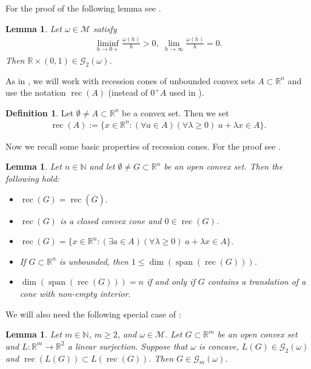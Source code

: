 \documentclass[10pt,a4paper]{amsart}
\newtheorem{lemma}[theorem]{Lemma}
\theoremstyle{definition}
\newtheorem{definition}[theorem]{Definition}
\newcommand{\R}{\mathbb{R}}
\newcommand{\N}{\mathbb{N}}
\newcommand{\M}{\mathcal{M}}
\newcommand{\rec}{\operatorname{rec}}
\newcommand{\spann}{\operatorname{span}}
\begin{document}
For the proof of the following lemma see \cite[Example 5.1]{KZ}.

\begin{lemma}\label{le_kz1}
Let $ \omega\in\M $ satisfy
\begin{align*}
\liminf_{h\to 0+}\frac{\omega(h)}{h}>0,\;\lim_{h\to\infty}\frac{\omega(h)}{h}=0.
\end{align*}
Then $ \R\times (0,1)\in\mathcal{G}_2(\omega) $.
\end{lemma}

As in \cite{KZ}, we will work with recession cones of unbounded convex sets $  A\subset\R^n $ and use the notation $ \rec(A) $ (instead of $ 0^+A $ used in \cite{R}).

\begin{definition}
Let $ \emptyset\neq A\subset\R^n $ be a convex set. Then we set
\begin{align*}
\rec(A):=\lbrace x\in\R^n:(\forall a\in A)(\forall\lambda\geq 0)\;a+\lambda x\in A\rbrace.
\end{align*}
\end{definition}

Now we recall some basic properties of recession cones. For the proof see \cite[Lemma 2.10]{KZ}.

\begin{lemma}\label{le_rec}
Let $ n\in\N $ and let $ \emptyset\neq G\subset\R^n $ be an open convex set. Then the following hold:
\begin{itemize}
\item[(i)] $ \rec(G)=\rec(\overline{G}) $.
\item[(ii)] $ \rec(G) $ is a closed convex cone and $ 0\in\rec(G) $.
\item[(iii)] $ \rec(G)=\lbrace x\in\R^n:(\exists a\in A)(\forall\lambda\geq 0)\;a+\lambda x\in A\rbrace $.
\item[(iv)] If $ G\subset\R^n $ is unbounded, then $ 1\leq\dim(\spann(\rec(G))) $.
\item[(v)] $ \dim(\spann(\rec(G)))=n $ if and only if $ G $ contains a translation of a cone with non-empty interior.
\end{itemize}
\end{lemma}

We will also need the following special case of \cite[Lemma 5.11]{KZ}:

\begin{lemma}\label{le_kz2}
Let $ m\in\N $, $ m\geq 2 $, and $ \omega\in\M $. Let $ G\subset\R^m $ be an open convex set and $ L:\R^m\to\R^2 $ a linear surjection. Suppose that $ \omega $ is concave, $ L(G)\in\mathcal{G}_2(\omega) $ and $ \rec(L(G))\subset L(\rec(G)) $. Then $ G\in\mathcal{G}_m(\omega) $.
\end{lemma}
\end{document}
